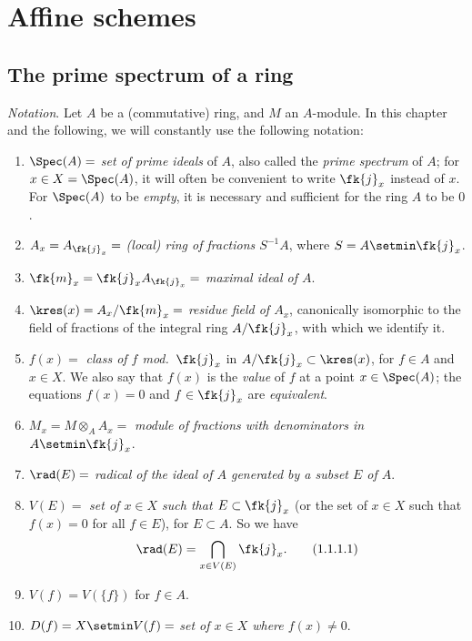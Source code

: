 \setcounter{section}{0}
\section{Affine schemes}
\label{section:affine-schemes}

\setcounter{subsection}{0}
\subsection{The prime spectrum of a ring}
\label{subsection:prime-spec}

\begin{env}[1.1.1]
\label{1.1.1.1}
\emph{Notation}. Let $A$ be a (commutative) ring, and $M$ an $A$-module.
In this chapter and the following, we will constantly use the following notation:
\begin{enumerate}[label=--]
  \item $\Spec(A)=$ \emph{set of prime ideals} of $A$, also called the \emph{prime spectrum} of $A$; for $x\in X=\Spec(A)$, it will often be convenient to write $\fk{j}_x$ instead of $x$.
    For $\Spec(A)$ to be \emph{empty}, it is necessary and sufficient for the ring $A$ to be $0$.
  \item $A_x=A_{\fk{j}_x}=$ \emph{(local) ring of fractions $S^{-1}A$}, where $S=A\setmin\fk{j}_x$.
  \item $\fk{m}_x=\fk{j}_x A_{\fk{j}_x}=$ \emph{maximal ideal of $A$}.
  \item $\kres(x)=A_x/\fk{m}_x=$ \emph{residue field of $A_x$}, canonically isomorphic to the field of fractions of the integral ring $A/\fk{j}_x$, with which we identify it.
  \item $f(x)=$ \emph{class of $f$ mod.~$\fk{j}_x$} in $A/\fk{j}_x\subset\kres(x)$, for $f\in A$ and $x\in X$.
    We also say that $f(x)$ is the \emph{value} of $f$ at a point $x\in\Spec(A)$; the equations $f(x)=0$ and $f\in\fk{j}_x$ are \emph{equivalent}.
  \item $M_x=M\otimes_A A_x=$ \emph{module of fractions with denominators in $A\setmin\fk{j}_x$}.
  \item $\rad(E)=$ \emph{radical of the ideal of $A$ generated by a subset $E$ of $A$}.
  \item $V(E)=$ \emph{set of $x\in X$ such that $E\subset\fk{j}_x$} (or the set of $x\in X$ such that $f(x)=0$ for all $f\in E$), for $E\subset A$.
    So we have
    \begin{equation*}
      \label{1.1.1.1.1}
      \rad(E)=\bigcap_{x\in V(E)}\fk{j}_x.
      \tag{1.1.1.1}
    \end{equation*}
  \item $V(f)=V(\{f\})$ for $f\in A$.
  \item $D(f)=X\setmin V(f)=$ \emph{set of $x\in X$ where $f(x)\neq 0$}.
\end{enumerate}
\end{env}

